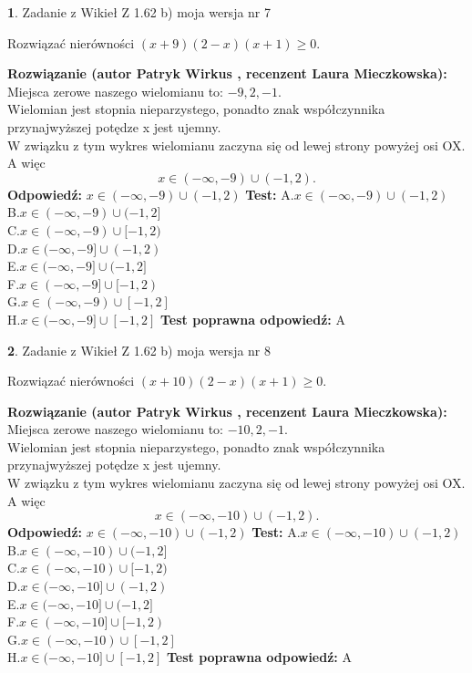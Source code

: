 \documentclass[12pt, a4paper]{article}
\theoremstyle{definition} %
\newtheorem{zad}{}
\newcommand{\zadStart}[1]{\begin{zad}#1\newline}
\newcommand{\zadStop}{\end{zad}}
\newcommand{\rozwStart}[2]{\noindent \textbf{Rozwiązanie (autor #1 , recenzent #2): }\newline}
\newcommand{\rozwStop}{\newline}
\newcommand{\odpStart}{\noindent \textbf{Odpowiedź:}\newline}
\newcommand{\odpStop}{\newline}
\newcommand{\testStart}{\noindent \textbf{Test:}\newline}
\newcommand{\testStop}{\newline}
\newcommand{\kluczStart}{\noindent \textbf{Test poprawna odpowiedź:}\newline}
\newcommand{\kluczStop}{\newline}
\begin{document}
\zadStart{Zadanie z Wikieł Z 1.62 b) moja wersja nr 7}

Rozwiązać nierówności $(x+9)(2-x)(x+1)\ge0$.
\zadStop
\rozwStart{Patryk Wirkus}{Laura Mieczkowska}
Miejsca zerowe naszego wielomianu to: $-9, 2, -1$.\\
Wielomian jest stopnia nieparzystego, ponadto znak współczynnika przy\linebreak najwyższej potędze x jest ujemny.\\ W związku z tym wykres wielomianu zaczyna się od lewej strony powyżej osi OX. A więc $$x \in (-\infty,-9) \cup (-1,2).$$
\rozwStop
\odpStart
$x \in (-\infty,-9) \cup (-1,2)$
\odpStop
\testStart
A.$x \in (-\infty,-9) \cup (-1,2)$\\
B.$x \in (-\infty,-9) \cup (-1,2]$\\
C.$x \in (-\infty,-9) \cup [-1,2)$\\
D.$x \in (-\infty,-9] \cup (-1,2)$\\
E.$x \in (-\infty,-9] \cup (-1,2]$\\
F.$x \in (-\infty,-9] \cup [-1,2)$\\
G.$x \in (-\infty,-9) \cup [-1,2]$\\
H.$x \in (-\infty,-9] \cup [-1,2]$
\testStop
\kluczStart
A
\kluczStop



\zadStart{Zadanie z Wikieł Z 1.62 b) moja wersja nr 8}

Rozwiązać nierówności $(x+10)(2-x)(x+1)\ge0$.
\zadStop
\rozwStart{Patryk Wirkus}{Laura Mieczkowska}
Miejsca zerowe naszego wielomianu to: $-10, 2, -1$.\\
Wielomian jest stopnia nieparzystego, ponadto znak współczynnika przy\linebreak najwyższej potędze x jest ujemny.\\ W związku z tym wykres wielomianu zaczyna się od lewej strony powyżej osi OX. A więc $$x \in (-\infty,-10) \cup (-1,2).$$
\rozwStop
\odpStart
$x \in (-\infty,-10) \cup (-1,2)$
\odpStop
\testStart
A.$x \in (-\infty,-10) \cup (-1,2)$\\
B.$x \in (-\infty,-10) \cup (-1,2]$\\
C.$x \in (-\infty,-10) \cup [-1,2)$\\
D.$x \in (-\infty,-10] \cup (-1,2)$\\
E.$x \in (-\infty,-10] \cup (-1,2]$\\
F.$x \in (-\infty,-10] \cup [-1,2)$\\
G.$x \in (-\infty,-10) \cup [-1,2]$\\
H.$x \in (-\infty,-10] \cup [-1,2]$
\testStop
\kluczStart
A
\kluczStop
\end{document}
